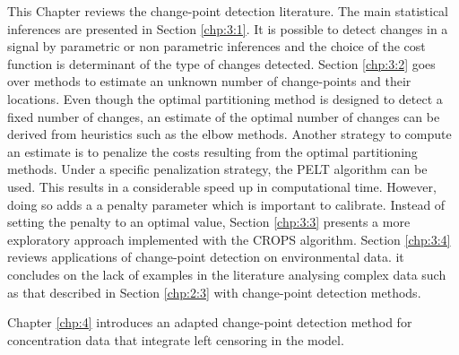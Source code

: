 This Chapter reviews the change-point detection literature. The main statistical inferences are presented in Section \ref{chp:3:1}. It is possible to detect changes in a signal by parametric or non parametric inferences and the choice of the cost function is determinant of the type of changes detected. Section \ref{chp:3:2} goes over methods to estimate an unknown number of change-points and their locations. Even though the optimal partitioning method is designed to detect a fixed number of changes, an estimate of the optimal number of changes can be derived from heuristics such as the elbow methods. Another strategy to compute an estimate is to penalize the costs resulting from the optimal partitioning methods. Under a specific penalization strategy, the PELT algorithm can be used. This results in a considerable speed up in computational time. However, doing so adds a a penalty parameter which is important to calibrate. Instead of setting the penalty to an optimal value, Section \ref{chp:3:3} presents a more exploratory approach implemented with the CROPS algorithm. Section \ref{chp:3:4} reviews applications of change-point detection on environmental data. it concludes on the lack of examples in the literature analysing complex data such as that described in Section \ref{chp:2:3} with change-point detection methods. 

Chapter \ref{chp:4} introduces an adapted change-point detection method for concentration data that integrate left censoring in the model.

